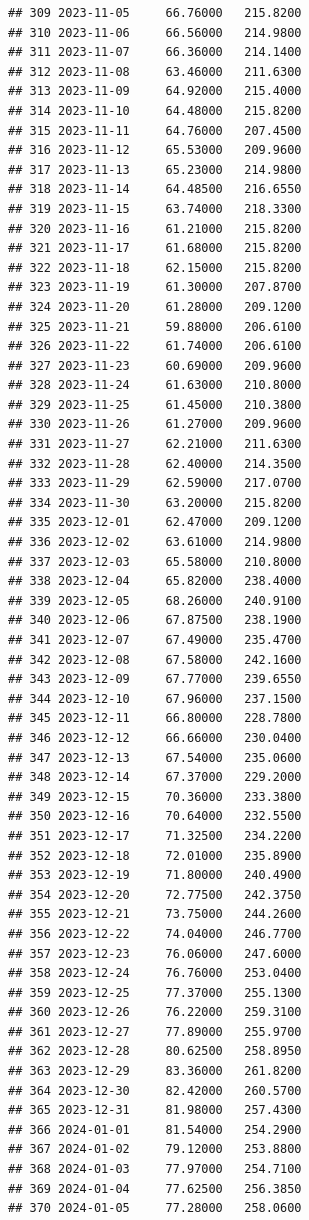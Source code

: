 \documentclass[
]{article}
\begin{document}
\begin{verbatim}
## 309 2023-11-05     66.76000   215.8200
## 310 2023-11-06     66.56000   214.9800
## 311 2023-11-07     66.36000   214.1400
## 312 2023-11-08     63.46000   211.6300
## 313 2023-11-09     64.92000   215.4000
## 314 2023-11-10     64.48000   215.8200
## 315 2023-11-11     64.76000   207.4500
## 316 2023-11-12     65.53000   209.9600
## 317 2023-11-13     65.23000   214.9800
## 318 2023-11-14     64.48500   216.6550
## 319 2023-11-15     63.74000   218.3300
## 320 2023-11-16     61.21000   215.8200
## 321 2023-11-17     61.68000   215.8200
## 322 2023-11-18     62.15000   215.8200
## 323 2023-11-19     61.30000   207.8700
## 324 2023-11-20     61.28000   209.1200
## 325 2023-11-21     59.88000   206.6100
## 326 2023-11-22     61.74000   206.6100
## 327 2023-11-23     60.69000   209.9600
## 328 2023-11-24     61.63000   210.8000
## 329 2023-11-25     61.45000   210.3800
## 330 2023-11-26     61.27000   209.9600
## 331 2023-11-27     62.21000   211.6300
## 332 2023-11-28     62.40000   214.3500
## 333 2023-11-29     62.59000   217.0700
## 334 2023-11-30     63.20000   215.8200
## 335 2023-12-01     62.47000   209.1200
## 336 2023-12-02     63.61000   214.9800
## 337 2023-12-03     65.58000   210.8000
## 338 2023-12-04     65.82000   238.4000
## 339 2023-12-05     68.26000   240.9100
## 340 2023-12-06     67.87500   238.1900
## 341 2023-12-07     67.49000   235.4700
## 342 2023-12-08     67.58000   242.1600
## 343 2023-12-09     67.77000   239.6550
## 344 2023-12-10     67.96000   237.1500
## 345 2023-12-11     66.80000   228.7800
## 346 2023-12-12     66.66000   230.0400
## 347 2023-12-13     67.54000   235.0600
## 348 2023-12-14     67.37000   229.2000
## 349 2023-12-15     70.36000   233.3800
## 350 2023-12-16     70.64000   232.5500
## 351 2023-12-17     71.32500   234.2200
## 352 2023-12-18     72.01000   235.8900
## 353 2023-12-19     71.80000   240.4900
## 354 2023-12-20     72.77500   242.3750
## 355 2023-12-21     73.75000   244.2600
## 356 2023-12-22     74.04000   246.7700
## 357 2023-12-23     76.06000   247.6000
## 358 2023-12-24     76.76000   253.0400
## 359 2023-12-25     77.37000   255.1300
## 360 2023-12-26     76.22000   259.3100
## 361 2023-12-27     77.89000   255.9700
## 362 2023-12-28     80.62500   258.8950
## 363 2023-12-29     83.36000   261.8200
## 364 2023-12-30     82.42000   260.5700
## 365 2023-12-31     81.98000   257.4300
## 366 2024-01-01     81.54000   254.2900
## 367 2024-01-02     79.12000   253.8800
## 368 2024-01-03     77.97000   254.7100
## 369 2024-01-04     77.62500   256.3850
## 370 2024-01-05     77.28000   258.0600

\end{verbatim}
\end{document}
